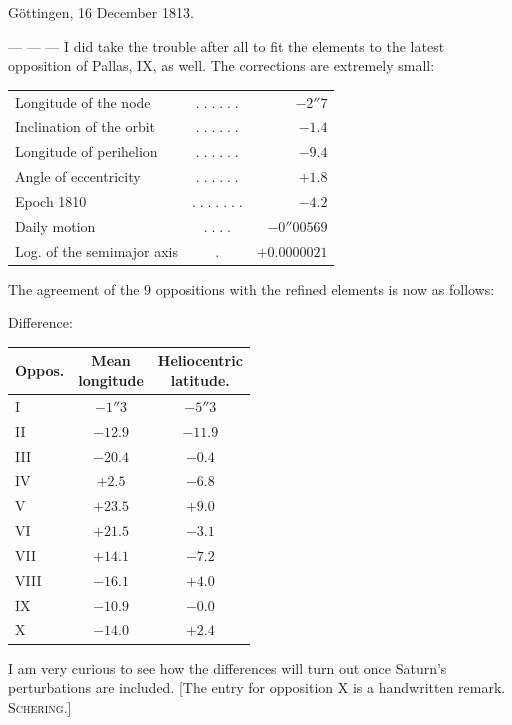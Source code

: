 \begin{flushright}\leavevmode{}Göttingen, 16 December 1813.\end{flushright}
\noindent --- --- --- I did take the trouble after all to fit the elements to the latest opposition of Pallas, IX, as well. The corrections are extremely small:
\begin{center}\fontsize{10}{12}\selectfont\setlength{\tabcolsep}{2pt}\renewcommand{\arraystretch}{1.15}\begin{tabular}{lcr}
Longitude of the node & $.\;.\;.\;.\;.\;.$ & $-2''7$\\
Inclination of the orbit & $.\;.\;.\;.\;.\;.$ & $-1.4$\\
Longitude of perihelion & $.\;.\;.\;.\;.\;.$ & $-9.4$\\
Angle of eccentricity & $.\;.\;.\;.\;.\;.$ & $+1.8$\\
Epoch 1810 & $.\;.\;.\;.\;.\;.\;.$ & $-4.2$\\
Daily motion & $.\;.\;.\;.$ & $-0''00569$\\
Log. of the semimajor axis & $.$ & $+0.0000021$\\
\end{tabular}\end{center}
\par\indent The agreement of the 9 oppositions with the refined elements is now as follows:
\begin{center}Difference:\end{center}
\begin{center}\fontsize{10}{12}\selectfont\setlength{\tabcolsep}{7pt}\renewcommand{\arraystretch}{1.15}\begin{tabular}{l|c|c}
Oppos. & \shortstack{Mean\\longitude} & \shortstack{Heliocentric\\latitude.}\\\hline
I & $-1''3$ & $-5''3$\\
II & $-12.9$ & $-11.9$\\
III & $-20.4$ & $-0.4$\\
IV & $+2.5$ & $-6.8$\\
V & $+23.5$ & $+9.0$\\
VI & $+21.5$ & $-3.1$\\
VII & $+14.1$ & $-7.2$\\
VIII & $-16.1$ & $+4.0$\\
IX & $-10.9$ & $-0.0$\\
X & $-14.0$ & $+2.4$\\
\end{tabular}\end{center}
\par\indent I am very curious to see how the differences will turn out once Saturn’s perturbations are included. [The entry for opposition X is a handwritten remark. \textsc{Schering}.]
